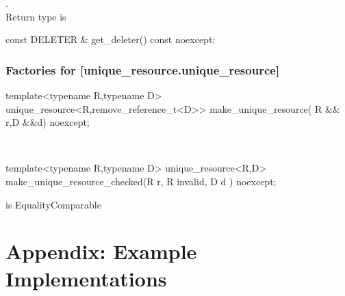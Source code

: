 \documentclass[ebook,11pt,article]{memoir}
\begin{document}
\pnum
\returns {}. 
\\Return type is 


\begin{itemdecl}
const DELETER & get_deleter() const noexcept;
\end{itemdecl}

\pnum
\returns {}

\subsection {Factories for  [unique_resource.unique_resource]}
\begin{itemdecl}
template<typename R,typename D>
unique_resource<R,remove_reference_t<D>>
make_unique_resource( R && r,D &&d) noexcept;
\end{itemdecl}

\pnum
\returns {}\\


\begin{itemdecl}
template<typename R,typename D>
unique_resource<R,D>
make_unique_resource_checked(R r, R invalid, D d ) noexcept;
\end{itemdecl}

\pnum
\requires {} is EqualityComparable

\pnum
\returns {}



\chapter{Appendix: Example Implementations}
\end{document}
